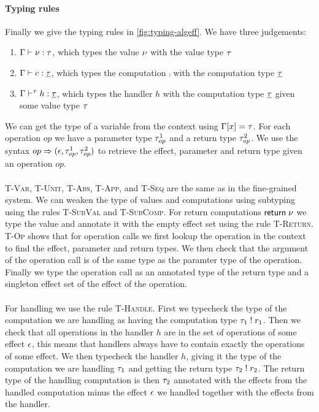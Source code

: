 {\paragraph{Typing rules}
Finally we give the typing rules in \cref{fig:typing-algeff}.
We have three judgements:
\begin{enumerate}
\item $\Gamma \vdash \nu : \tau$, which types the value $\nu$ with the value type $\tau$
\item $\Gamma \vdash c : \underline{\tau}$, which types the computation $\comp$ with the computation type $\underline{\tau}$
\item $\Gamma \vdash^{\tau} h : \underline{\tau}$, which types the handler $h$ with the computation type $\underline{\tau}$ given some value type $\tau$
\end{enumerate}
We can get the type of a variable from the context using $\Gamma[x] = \tau$.
For each operation $op$ we have a parameter type $\tau^1_{op}$ and a return type $\tau^2_{op}$.
We use the syntax $op \Rightarrow (\epsilon, \tau^1_{op}, \tau^2_{op})$ to retrieve the effect, parameter and return type given an operation $op$.
\\\\
\textsc{T-Var}, \textsc{T-Unit}, \textsc{T-Abs}, \textsc{T-App}, and \textsc{T-Seq} are the same as in the fine-grained system.
We can weaken the type of values and computations using subtyping using the rules \textsc{T-SubVal} and \textsc{T-SubComp}.
For return computations $\mathsf{return} \; \nu$ we type the value and annotate it with the empty effect set using the rule \textsc{T-Return}.
\textsc{T-Op} shows that for operation calls we first lookup the operation in the context to find the effect, parameter and return types.
We then check that the argument of the operation call is of the same type as the paramter type of the operation.
Finally we type the operation call as an annotated type of the return type and a singleton effect set of the effect of the operation.
\\\\
For handling we use the rule \textsc{T-Handle}.
First we typecheck the type of the computation we are handling as having the computation type $\tau_1 \; ! \; r_1$.
Then we check that all operations in the handler $h$ are in the set of operations of some effect $\epsilon$, this means that handlers always have to contain exactly the operations of some effect.
We then typecheck the handler $h$, giving it the type of the computation we are handling $\tau_1$  and getting the return type $\tau_2 \; ! \; r_2$.
The return type of the handling computation is then $\tau_2$ annotated with the effects from the handled computation minus the effect $\epsilon$ we handled together with the effects from the handler.
}
